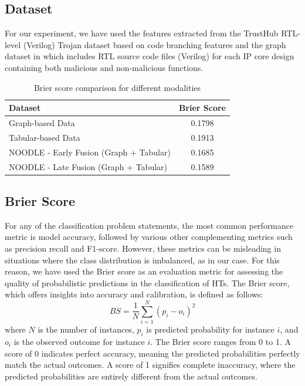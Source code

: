 \subsection*{Dataset}
For our experiment, we have used the features extracted from the TrustHub RTL-level (Verilog) Trojan dataset based on code branching features \cite{px6s-sm21-22} and the graph dataset in \cite{yu2021hw2vec} which includes RTL source code files (Verilog) for each IP core design containing both malicious and non-malicious functions.

{\renewcommand{\arraystretch}{1.2}%
\begin{table}[ht]
\caption{Brier score comparison for different modalities}
\centering
\begin{tabular}{lc}
\hline
\textbf{Dataset} & \textbf{Brier Score} \\ \hline 
Graph-based Data & 0.1798 \\ \hline
Tabular-based Data & 0.1913 \\ \hline
NOODLE - Early Fusion (Graph + Tabular) & 0.1685 \\ \hline
NOODLE - Late Fusion (Graph + Tabular)  & 0.1589 \\ \hline
\end{tabular}
\label{tab:table1}
\end{table}
}

\subsection*{Brier Score}
For any of the classification problem statements, the most common performance metric is model accuracy, followed by various other complementing metrics such as precision recall and F1-score. However, these metrics can be misleading in situations where the class distribution is imbalanced, as in our case. For this reason, we have used the Brier score as an evaluation metric for assessing the quality of probabilistic predictions in the classification of HTs. The Brier score, which
offers insights into accuracy and calibration, is defined as follows:
\begin{equation}
BS = \frac{1}{N} \sum_{i=1}^{N} (p_i - o_i)^2
\end{equation}
where \(N\) is the number of instances, \(p_i\) is predicted probability for instance \(i\), and \(o_i\) is the observed outcome for instance \(i\). The Brier score ranges from 0 to 1. A score of 0 indicates perfect accuracy, meaning the predicted probabilities perfectly match the actual outcomes. A score of 1 signifies complete inaccuracy, where the predicted probabilities are entirely different from the actual outcomes.

